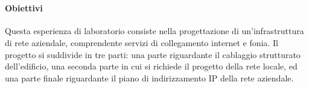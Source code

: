 %
~\label{sec:sommario}

\paragraph{Obiettivi}
Questa esperienza di laboratorio consiste nella progettazione di un'infrastruttura di rete aziendale,
comprendente servizi di collegamento internet e fonia. Il progetto si suddivide in tre parti: una parte
riguardante il cablaggio strutturato dell'edificio, una seconda parte in cui si richiede il progetto della
rete locale, ed una parte finale riguardante il piano di indirizzamento IP della rete aziendale.